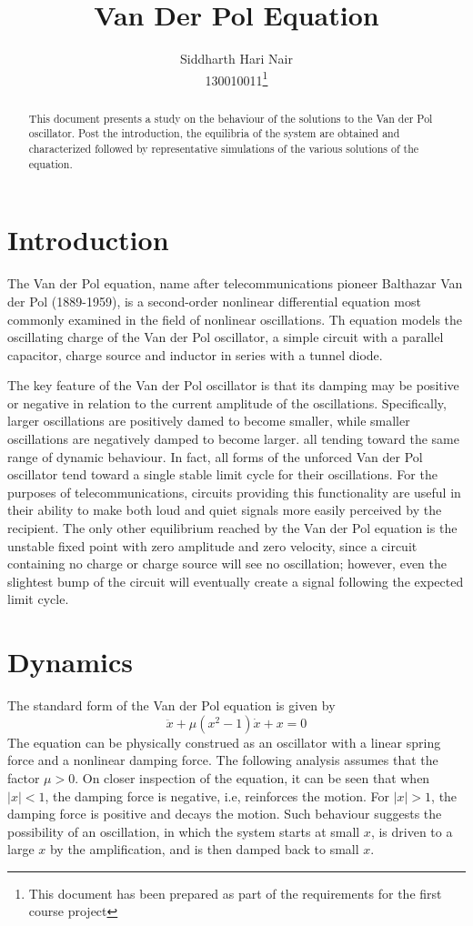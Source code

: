 \documentclass[11pt]{article}
\title{Van Der Pol Equation}
\author{Siddharth Hari Nair\\130010011\thanks{This document has been prepared as part of the requirements for the first course project}}
\date{}
\begin{document}
\maketitle
\begin{abstract}
This document presents a study on the behaviour of the solutions to the Van der Pol oscillator. Post the introduction, the equilibria of the system are obtained and characterized followed by representative simulations of the various solutions of the equation.
\end{abstract}
\section{Introduction}
The Van der Pol equation, name after telecommunications pioneer Balthazar Van der Pol (1889-1959), is a second-order nonlinear differential equation most commonly examined in the field of nonlinear oscillations. Th equation models the oscillating charge of the Van der Pol oscillator, a simple circuit with a parallel capacitor, charge source and inductor in series with a tunnel diode.
\par
The key feature  of the Van der Pol oscillator is that its damping may be positive or negative in relation to the current amplitude of the oscillations. Specifically, larger oscillations are positively damed to become smaller, while smaller oscillations are negatively damped to become larger. all tending toward the same range of dynamic behaviour. In fact, all forms of the unforced Van der Pol oscillator tend toward a single stable limit cycle for their oscillations. For the purposes of telecommunications, circuits providing this functionality are useful in their ability to make both loud and quiet signals more easily perceived by the recipient. The only other equilibrium reached by the Van der Pol equation is the unstable  fixed point with zero amplitude and zero velocity, since a circuit containing no charge or charge source will see no oscillation; however, even the slightest bump of the circuit will eventually create a signal following the expected limit cycle.
\section{Dynamics}
The standard form of the Van der Pol equation is given by
\begin{equation}\label{vdp}
\ddot{x}+\mu(x^2-1)\dot{x}+x=0
\end{equation}
The equation can be physically construed as an oscillator with a linear spring force and a nonlinear damping force. The following analysis assumes that the factor $\mu >0$. On closer inspection of the equation, it can be seen that when $|x| <1$, the damping force is negative, i.e, reinforces the motion. For $|x| >1$, the damping force is positive and decays the motion. Such behaviour suggests the possibility of an oscillation, in which the system starts at small $x$, is driven to a large $x$ by the amplification, and is then damped back to small $x$.
\end{document}
